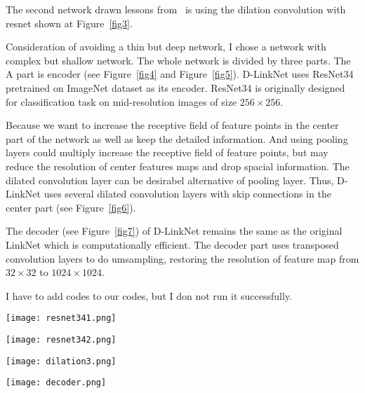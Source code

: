 \documentclass[a4paper]{article}
\begin{document}
The second network drawn lessons from~\cite{D} is using the dilation convolution with resnet shown at Figure~\ref{fig3}.

Consideration of avoiding a thin but deep network, I chose a network with complex but shallow network. The whole network is divided by three parts. The A part is encoder (see Figure~\ref{fig4} and Figure~\ref{fig5}). D-LinkNet uses ResNet34 pretrained on ImageNet dataset as its encoder. ResNet34 is originally designed for classification task on mid-resolution images of size $256\times 256$.

 Because we want to increase the receptive field of feature points in the center part of the network as well as keep the detailed information. And using pooling layers could multiply increase the receptive field of feature points, but may reduce the resolution of center features maps and drop spacial information. The dilated convolution layer can be desirabel alternative of pooling layer. Thus, D-LinkNet uses several dilated convolution layers with skip connections in the center part (see Figure~\ref{fig6}). 

 The decoder (see Figure~\ref{fig7}) of D-LinkNet remains the same as the original LinkNet which is computationally efficient. The decoder part uses transposed convolution layers to do umsampling, restoring the resolution of feature map from $32\times 32$ to $1024\times 1024$.

 I have to add codes to our codes, but I don not run it successfully.

 \begin{figure*}
 \begin{center}
 \texttt{[image: resnet341.png]}
 \end{center}
 \caption{The first part of the ResNet34 code.}
 \label{fig4}
 \end{figure*}

  \begin{figure*}
 \begin{center}
 \texttt{[image: resnet342.png]}
 \end{center}
 \caption{The second part of the ResNet34 code.}
 \label{fig5}
 \end{figure*}

 \begin{figure*}
 \begin{center}
 \texttt{[image: dilation3.png]}
 \end{center}
 \caption{The code for dilation convolution.}
 \label{fig6}
 \end{figure*}

 \begin{figure*}
 \begin{center}
 \texttt{[image: decoder.png]}
 \end{center}
 \caption{The code for decoder part.}
 \label{fig7}
 \end{figure*}













{\small


}
\end{document}
